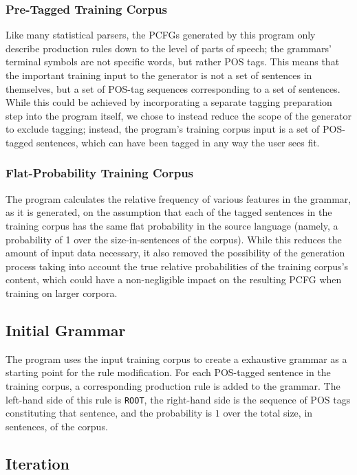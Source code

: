 \documentclass[paper=a4, fontsize=11pt]{scrartcl} %
\numberwithin{equation}{section} %
\numberwithin{figure}{section} %
\numberwithin{table}{section} %
\begin{document}
\subsubsection{Pre-Tagged Training Corpus}

Like many statistical parsers, the PCFGs generated by this program only describe production rules down to the level of parts of speech; the grammars' terminal symbols are not specific words, but rather POS tags. This means that the important training input to the generator is not a set of sentences in themselves, but a set of POS-tag sequences corresponding to a set of sentences. While this could be achieved by incorporating a separate tagging preparation step into the program itself, we chose to instead reduce the scope of the generator to exclude tagging; instead, the program's training corpus input is a set of POS-tagged sentences, which can have been tagged in any way the user sees fit.

\subsubsection{Flat-Probability Training Corpus}

The program calculates the relative frequency of various features in the grammar, as it is generated, on the assumption that each of the tagged sentences in the training corpus has the same flat probability in the source language (namely, a probability of 1 over the size-in-sentences of the corpus). While this reduces the amount of input data necessary, it also removed the possibility of the generation process taking into account the true relative probabilities of the training corpus's content, which could have a non-negligible impact on the resulting PCFG when training on larger corpora.

\subsection{Initial Grammar}

The program uses the input training corpus to create a exhaustive grammar as a starting point for the rule modification. For each POS-tagged sentence in the training corpus, a corresponding production rule is added to the grammar. The left-hand side of this rule is \texttt{ROOT}, the right-hand side is the sequence of POS tags constituting that sentence, and the probability is $1$ over the total size, in sentences, of the corpus.
\subsection{Iteration}
\end{document}
